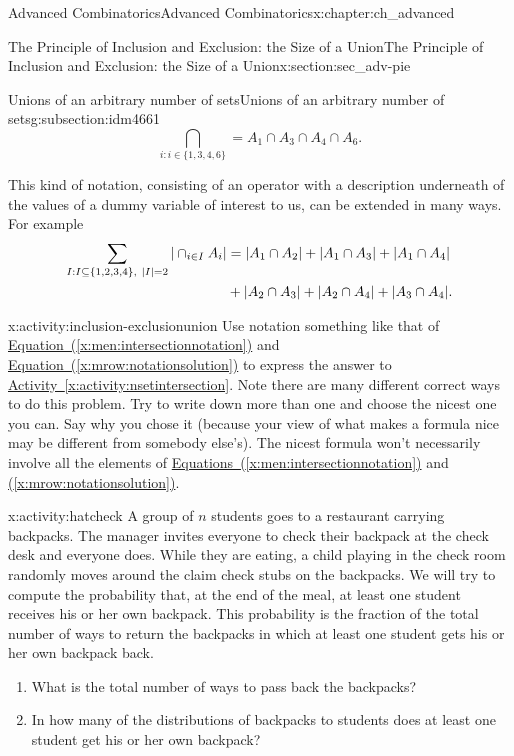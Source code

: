 \documentclass[oneside,10pt,]{book}
\numberwithin{equation}{chapter}
\newcommand{\amp}{&}
\begin{document}
\begin{chapterptx}{Advanced Combinatorics}{}{Advanced Combinatorics}{}{}{x:chapter:ch_advanced}
\begin{sectionptx}{The Principle of Inclusion and Exclusion: the Size of a Union}{}{The Principle of Inclusion and Exclusion: the Size of a Union}{}{}{x:section:sec_adv-pie}
\begin{subsectionptx}{Unions of an arbitrary number of sets}{}{Unions of an arbitrary number of sets}{}{}{g:subsection:idm4661}
\begin{equation}
\bigcap_{i:i\in
\{1,3,4,6\}} = A_1\cap A_3\cap A_4 \cap A_6.\label{x:men:intersectionnotation}
\end{equation}
%
\par
This kind of notation, consisting of an operator with a description underneath of the values of a dummy variable of interest to us, can be extended in many ways. For example%
\begin{align}
\sum_{I:I \subseteq \{1,2,3,4\}, \ |I|=2} |\cap_{i\in I}
A_i|  \amp =  |A_1\cap A_2|+ |A_1\cap A_3|
+|A_1\cap A_4|\notag\\
\amp +  |A_2\cap A_3|+
|A_2\cap A_4| +|A_3\cap A_4|.\label{x:mrow:notationsolution}
\end{align}
%
\begin{activity}{}{x:activity:inclusion-exclusionunion}%
Use notation something like that of \hyperref[x:men:intersectionnotation]{Equation~(\ref{x:men:intersectionnotation})} and \hyperref[x:mrow:notationsolution]{Equation~(\ref{x:mrow:notationsolution})} to express the answer to \hyperref[x:activity:nsetintersection]{Activity~\ref{x:activity:nsetintersection}}. Note there are many different correct ways to do this problem. Try to write down more than one and choose the nicest one you can. Say why you chose it (because your view of what makes a formula nice may be different from somebody else's). The nicest formula won't necessarily involve all the elements of \hyperref[x:men:intersectionnotation]{Equations~(\ref{x:men:intersectionnotation})} and \hyperref[x:mrow:notationsolution]{(\ref{x:mrow:notationsolution})}.%
\end{activity}
\begin{activity}{}{x:activity:hatcheck}%
A group of \(n\) students goes to a restaurant carrying backpacks. The manager invites everyone to check their backpack at the check desk and everyone does. While they are eating, a child playing in the check room randomly moves around the claim check stubs on the backpacks. We will try to compute the probability that, at the end of the meal, at least one student receives his or her own backpack.  This probability is the fraction of the total number of ways to return the backpacks in which at least one student gets his or her own backpack back.%
\begin{enumerate}[font=\bfseries,label=(\alph*),ref=\alph*]
\item{}What is the total number of ways to pass back the backpacks?%
\item{}In how many of the distributions of backpacks to students does at least one student get his or her own backpack?%

\end{enumerate}
\end{activity}
\end{subsectionptx}
\end{sectionptx}
\end{chapterptx}
\end{document}
